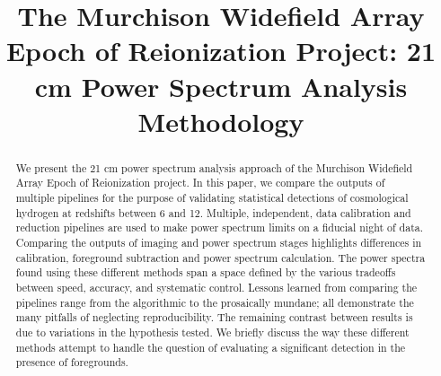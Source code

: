 \documentclass[twolcolumn,iop]{emulateapj}
\begin{document}

\title{The Murchison Widefield Array Epoch of Reionization Project: 21 cm Power Spectrum Analysis Methodology}





\begin{abstract}
We present the 21 cm power spectrum analysis approach of the Murchison Widefield Array Epoch of Reionization project.  In this paper, we compare the outputs of multiple pipelines for the purpose of validating statistical detections of cosmological hydrogen at redshifts between 6 and 12. Multiple, independent, data calibration and reduction pipelines are used to make power spectrum limits on a fiducial night of data.  Comparing the outputs of imaging and power spectrum stages highlights differences in calibration, foreground subtraction and power spectrum calculation. The power spectra found using these different methods span a space defined by the various tradeoffs between speed, accuracy, and systematic control.  Lessons learned from comparing the pipelines range from the algorithmic to the prosaically mundane; all demonstrate the many pitfalls of neglecting reproducibility.  The remaining contrast between results is due to variations in the hypothesis tested. We briefly discuss the way these different methods attempt to handle the question of evaluating a significant detection in the presence of foregrounds.


\end{abstract}






\end{document}
